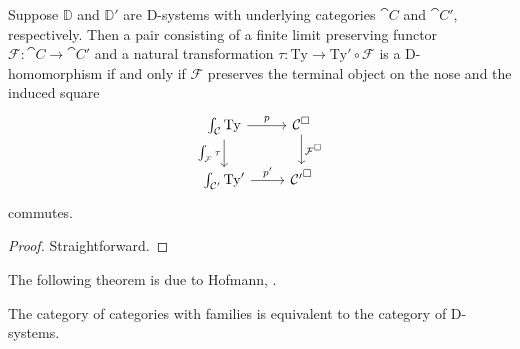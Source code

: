 \begin{lem}
Suppose $\mathbb{D}$ and $\mathbb{D}'$ are D-systems with underlying categories
$\cat{C}$ and $\cat{C}'$, respectively. Then a pair consisting of a finite
limit preserving functor
$\mathcal{F}:\cat{C}\to\cat{C}'$ and a natural transformation
$\tau:\mathrm{Ty}\to \mathrm{Ty'}\circ\mathcal{F}$ is a D-homomorphism if and
only if $\mathcal{F}$ preserves the terminal object on the nose and the induced
square
\begin{equation*}
\begin{tikzcd}
\int_{\cat{C}}\mathrm{Ty} \arrow[r,"p"] \arrow[d,swap,"{\int_{\mathcal{F}}\tau}"] & \cat{C}^{\square} \arrow[d,"\mathcal{F}^\square"] \\
\int_{\cat{C}'}\mathrm{Ty}' \arrow[r,"{p'}"] & {\cat{C}'}^\square
\end{tikzcd}
\end{equation*}
commutes.
\end{lem}

\begin{proof}
Straightforward.
\end{proof}


The following theorem is due to Hofmann, \cite[section 3.2]{Hofmann_syntax_semantics}. 

\begin{thm}\label{thm:DD}
The category of categories with families is equivalent to the category of 
D-systems.%
\end{thm}

\begin{comment}
Since this theorem basically asserts that a category with families is a
comprehension category
\end{comment}

